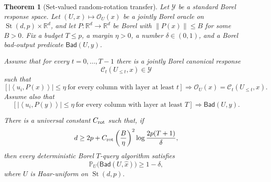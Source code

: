 \documentclass[11pt,a4paper]{article}
\newcommand{\R}{\mathbb{R}}
\newcommand{\Prob}{\mathbb{P}}
\newcommand{\norm}[1]{\left\lVert #1\right\rVert}
\newcommand{\abs}[1]{\left\lvert #1\right\rvert}
\newcommand{\inner}[2]{\left\langle #1,#2\right\rangle}
\newcommand{\cO}{\mathcal O}
\newcommand{\cY}{\mathcal Y}
\newcommand{\cC}{\mathcal C}
\newtheorem{theorem}{Theorem}[section]
\theoremstyle{definition}
\numberwithin{equation}{section}
\newcommand{\St}{\operatorname{St}}
\begin{document}
\begin{theorem}[Set-valued random-rotation transfer]\label{thm:transfer}
Let $\cY$ be a standard Borel response space.  Let
$(U,x)\mapsto\cO_U(x)$ be a jointly Borel oracle on
$\St(d,p)\times\R^d$, and let $P:\R^d\to\R^d$ be Borel with $\norm{P(x)}\le B$ for some $B>0$.  Fix a budget $T\le p$, a margin $\eta>0$, a number $\delta\in(0,1)$, and a Borel bad-output predicate $\mathsf{Bad}(U,y)$.

Assume that for every $t=0,\ldots,T-1$ there is a jointly Borel canonical response
\[
 \cC_t(U_{\le t},x)\in\cY
\]
such that
\begin{equation}\label{eq:canonical-agreement}
 \left[
 \abs{\inner{u_i}{P(x)}}\le\eta
 \ \text{for every column with layer at least }t
 \right]
 \Longrightarrow
 \cO_U(x)=\cC_t(U_{\le t},x).
\end{equation}
Assume also that
\begin{equation}\label{eq:tail-obstruction-abstract}
 \left[
 \abs{\inner{u_i}{P(y)}}\le\eta
 \ \text{for every column with layer at least }T
 \right]
 \Longrightarrow
 \mathsf{Bad}(U,y).
\end{equation}

There is a universal constant $C_{\rm rot}$ such that, if
\begin{equation}\label{eq:abstract-dim}
 d\ge2p+C_{\rm rot}\left(\frac B\eta\right)^2
 \log\frac{2p(T+1)}{\delta},
\end{equation}
then every deterministic Borel $T$-query algorithm satisfies
\[
 \Prob_U\bigl(\mathsf{Bad}(U,\widehat x)\bigr)\ge1-\delta,
\]
where $U$ is Haar-uniform on $\St(d,p)$.
\end{theorem}
\end{document}
